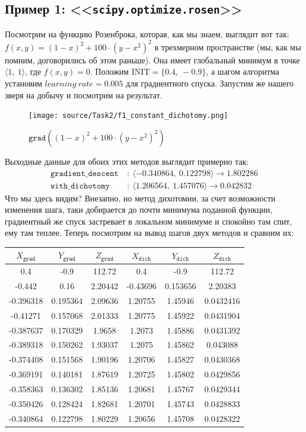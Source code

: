 \documentclass[12pt, a4paper, oneside, final]{article}
\begin{document}
	\subsection*{Пример 1: <<\texttt{scipy.optimize.rosen}>>}
	Посмотрим на функцию Розенброка, которая, как мы знаем, выглядит вот так: $f(x, y) = (1 - x)^{2} + 100 \cdot (y - x^2)^2$ в трехмерном пространстве (мы, как мы помним, договорились об этом раньше). Она имеет глобальный минимум в точке $\langle 1, ~ 1 \rangle$, где $f(x, y) = 0$. Положим $\text{INIT} = \{0.4, ~ -0.9\}$, а шагом алгоритма установим $learning~rate = 0.005$ для градиентного спуска. Запустим же нашего зверя на добычу и посмотрим на результат.
	\begin{figure}[H]
		\centering
		\texttt{[image: source/Task2/f1\_constant\_dichotomy.png]}
		\caption{$\texttt{grad}((1 - x)^{2} + 100 \cdot (y - x^2)^2)$}
	\end{figure}
	Выходные данные для обоих этих методов выглядит примерно так:
	\begin{align*}
		\texttt{gradient\_descent}~&:~\langle -0.340864, ~ 0.122798\rangle \to 1.802286 \\
		\texttt{with\_dichotomy}~&:~\langle 1.206564, ~ 1.457076\rangle \to 0.042832
	\end{align*}
	Что мы здесь видим? Внезапно, но метод дихотомии, за счет возможности изменения шага, таки добирается до почти минимума поданной функции, градиентный же спуск застревает в локальном минимуме и спокойно там спит, ему там теплее. Теперь посмотрим на вывод шагов двух методов и сравним их:
	\begin{table}[H]
		\centering
		\begin{tabular}{|c|c|c|c|c|c|}
			$X_{\texttt{grad}}$ & $Y_{\texttt{grad}}$ & $Z_{\texttt{grad}}$ & $X_{\texttt{dich}}$ & $Y_{\texttt{dich}}$ & $Z_{\texttt{dich}}$ \\ \hline
			0.4&-0.9&112.72&0.4&-0.9&112.72 \\
			-0.442&0.16&2.20442&-0.43696&0.153656&2.20383 \\
			-0.396318&0.195364&2.09636&1.20755&1.45946&0.0432416 \\
			-0.41271&0.157068&2.01333&1.20775&1.45922&0.0431904 \\
			-0.387637&0.170329&1.9658&1.2073&1.45886&0.0431392 \\
			-0.389318&0.150262&1.93037&1.2075&1.45862&0.043088 \\
			-0.374408&0.151568&1.90196&1.20706&1.45827&0.0430368 \\
			-0.369191&0.140181&1.87619&1.20725&1.45802&0.0429856 \\
			-0.358363&0.136302&1.85136&1.20681&1.45767&0.0429344 \\
			-0.350426&0.128424&1.82681&1.20701&1.45743&0.0428833 \\
			-0.340864&0.122798&1.80229&1.20656&1.45708&0.0428322
		\end{tabular}
	\end{table}
\end{document}
